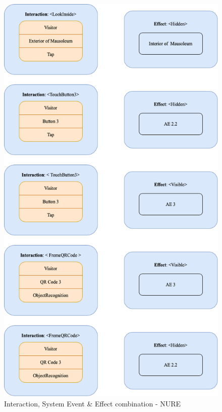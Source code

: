 \begin{figure}[h]
	\centering
	\includegraphics[width=12cm]{Figures/Conceptual Model/IM_NURE2.png}
	\caption{Interaction, System Event \& Effect combination - NURE}
	\label{fig:IM2NURE}
\end{figure}

